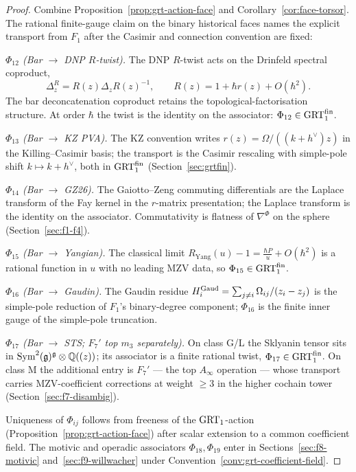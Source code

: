 \begin{proof}
Combine Proposition~\ref{prop:grt-action-face} and
Corollary~\ref{cor:face-torsor}. The rational finite-gauge claim
on the binary historical faces names the explicit transport from
$F_1$ after the Casimir and connection convention are fixed:

\smallskip\noindent
\emph{$\Phi_{12}$ (Bar $\to$ DNP $R$-twist).} The DNP $R$-twist
acts on the Drinfeld spectral coproduct,
\[
\Delta_z^R = R(z)\Delta_z R(z)^{-1},\qquad
R(z) = 1 + \hbar r(z) + O(\hbar^2).
\]
The bar deconcatenation coproduct retains the
topological-factorisation structure. At order $\hbar$ the twist is
the identity on the associator: $\Phi_{12}\in\mathrm{GRT}_1^{\mathrm{fin}}$.

\smallskip\noindent
\emph{$\Phi_{13}$ (Bar $\to$ KZ PVA).} The KZ convention writes
$r(z) = \Omega/((k+h^\vee)z)$ in the Killing--Casimir basis; the
transport is the Casimir rescaling with simple-pole shift
$k\mapsto k+h^\vee$, both in $\mathrm{GRT}_1^{\mathrm{fin}}$
(Section~\ref{sec:grtfin}).

\smallskip\noindent
\emph{$\Phi_{14}$ (Bar $\to$ GZ26).} The Gaiotto--Zeng commuting
differentials are the Laplace transform of the Fay kernel in the
$r$-matrix presentation; the Laplace transform is the identity on
the associator. Commutativity is flatness of $\nabla^\Phi$ on the
sphere (Section~\ref{sec:f1-f4}).

\smallskip\noindent
\emph{$\Phi_{15}$ (Bar $\to$ Yangian).} The classical limit
$R_{\mathrm{Yang}}(u)-1 = \frac{\hbar P}{u}+O(\hbar^2)$ is a
rational function in $u$ with no leading MZV data, so
$\Phi_{15}\in\mathrm{GRT}_1^{\mathrm{fin}}$.

\smallskip\noindent
\emph{$\Phi_{16}$ (Bar $\to$ Gaudin).} The Gaudin residue
$H_i^{\mathrm{Gaud}} = \sum_{j\neq i}\Omega_{ij}/(z_i-z_j)$ is the
simple-pole reduction of $F_1$'s binary-degree component;
$\Phi_{16}$ is the finite inner gauge of the simple-pole
truncation.

\smallskip\noindent
\emph{$\Phi_{17}$ (Bar $\to$ STS; $F_7'$ top $m_3$ separately).}
On class G/L the Sklyanin tensor sits in
$\mathrm{Sym}^2(\mathfrak{g})^{\mathfrak{g}}\otimes \mathbb{Q}((z))$; its associator
is a finite rational twist, $\Phi_{17}\in\mathrm{GRT}_1^{\mathrm{fin}}$. On
class M the additional entry is $F_7'$ — the top $A_\infty$
operation — whose transport carries MZV-coefficient corrections
at weight $\geq 3$ in the higher cochain tower
(Section~\ref{sec:f7-disambig}).

\smallskip
Uniqueness of $\Phi_{ij}$ follows from freeness of the
$\mathrm{GRT}_1$-action (Proposition~\ref{prop:grt-action-face}) after
scalar extension to a common coefficient field. The motivic and
operadic associators $\Phi_{18},\Phi_{19}$ enter in
Sections~\ref{sec:f8-motivic} and~\ref{sec:f9-willwacher} under
Convention~\ref{conv:grt-coefficient-field}.
\end{proof}

